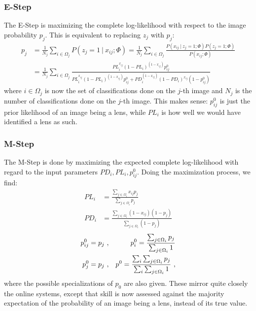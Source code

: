 \documentclass[useAMS,usenatbib,a4paper]{mn2e}
\begin{document}
\subsubsection{E-Step}
\label{sec:formalism:em:estep}
The E-Step is maximizing the complete log-likelihood with respect to the image
probability $p_j$.  This is equivalent to replacing $z_j$ with $p_j$:
\begin{align}
  p_j &= \frac{1}{N_j} \sum_{i \in \Omega_j} P(z_j = 1 \ | \ x_{ij} ; \Phi) =
  \frac{1}{N_j} \sum_{i \in \Omega_j} \frac{ P(x_{ij} \ | \ z_j = 1; \Phi)
P(z_j = 1 ; \Phi)}{P(x_{ij} ; \Phi)} \\
&= \frac{1}{N_j} \sum_{i \in \Omega_j} \frac{ PL_{i}^{x_{ij}} (1 - PL_{i})^{(1 -
x_{ij})} p_{ij}^{0}}{ PL_{i}^{x_{ij}} (1 -
  PL_{i})^{(1 - x_{ij})} p_{ij}^{0} + PD_{i}^{(1 - x_{ij})} (1 -
PD_{i})^{x_{ij}} (1 - p_{ij}^{0})}
\end{align}
where $i \in \Omega_j$ is now the set of classifications done on the $j$-th
image and $N_j$ is the number of classifications done on the $j$-th image. This
makes sense: $p_{ij}^{0}$ is just the prior likelihood of an image being a lens,
while $PL_{i}$ is how well we would have identified a lens as such.


\subsubsection{M-Step}
\label{sec:formalism:em:mstep}
The M-Step is done by maximizing the expected complete log-likelihood with
regard to the input parameters $PD_{i}, PL_{i}, p_{ij}^{0}$. Doing the
maximization process, we find:
\begin{align}
  PL_{i} &= \frac{\sum_{j \in \Omega_i} x_{ij} p_{j}}{\sum_{j \in
\Omega_i} p_{j}} \\
  PD_{i} &= \frac{\sum_{j \in \Omega_i} (1 - x_{ij}) (1 - p_{j})}{\sum_{j \in
\Omega_i} (1 - p_{j})}
\end{align}
\begin{align}
  p_{ij}^{0} &= p_{j} \ , &p_{i}^{0} = \frac{\sum_{j \in \Omega_i}
p_{j}}{\sum_{j \in \Omega_i} 1} \notag\\
   p_{j}^{0} &= p_{j} \ , &p^{0} = \frac{\sum_i \sum_{j \in \Omega_i}
p_{j}}{\sum_i \sum_{j \in
  \Omega_i} 1} \ ,
\end{align}
where the possible specializations of $p_0$ are also given. These mirror quite
closely the online systems, except that skill is now assessed against
the majority expectation of the probability of an image being a lens, instead
of its true value.
\end{document}
